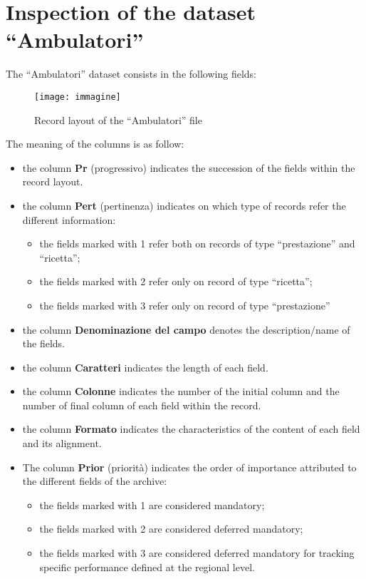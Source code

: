 \documentclass[paper=a4, fontsize=11pt]{scrartcl} %
\numberwithin{equation}{section} %
\numberwithin{figure}{section} %
\numberwithin{table}{section} %
\begin{document}
\section{Inspection of the dataset ``Ambulatori''}
The ``Ambulatori'' dataset consists in the following fields:
\begin{figure} [h]
\centering
\texttt{[image: immagine]}
\caption{Record layout of the ``Ambulatori'' file}\label{fig:1}
\end{figure}
\newpage
The meaning of the columns is as follow:
\begin{itemize}
\item the column \textbf{Pr} (progressivo) indicates the succession of the fields within the record layout.
\item the column \textbf{Pert} (pertinenza) indicates on which type of records refer the different information:
\begin{itemize}
\item the fields marked with 1 refer both on records of type ``prestazione'' and ``ricetta'';
\item the fields marked with 2 refer only on record of type ``ricetta'';
\item the fields marked with 3 refer only on record of type ``prestazione''
\end{itemize}
\item the column \textbf{Denominazione del campo} denotes the description/name of the fields.
\item the column \textbf{Caratteri} indicates the length of each field.
\item the column \textbf{Colonne} indicates the number of the initial column and the number of final column of each field within the record.
\item the column \textbf{Formato} indicates the characteristics of the content of each field and its alignment.
\item The column \textbf{Prior} (priorità) indicates the order of importance attributed to the different fields of the archive:
\begin{itemize}
\item the fields marked with 1 are considered mandatory;
\item the fields marked with 2 are considered deferred mandatory;
\item the fields marked with 3 are considered deferred mandatory for tracking specific performance defined at the regional level.
\end{itemize}
\end{itemize} 
\end{document}
